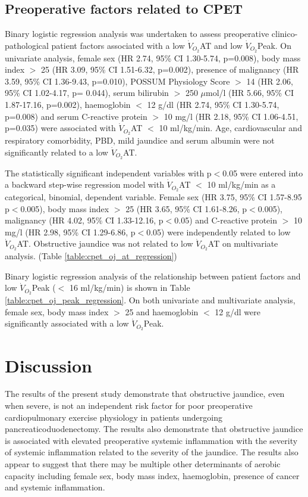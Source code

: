\subsection{Preoperative factors related to CPET}
Binary logistic regression analysis was undertaken to assess preoperative clinico-pathological patient factors associated with a low $\dot{V}_{O_2}$AT and low $\dot{V}_{O_2}$Peak. 
On univariate analysis, female sex (HR 2.74, 95\% CI 1.30-5.74, p=0.008), body mass index $>$ 25 (HR 3.09, 95\% CI 1.51-6.32, p=0.002), presence of malignancy (HR 3.59, 95\% CI 1.36-9.43, p=0.010), POSSUM Physiology Score $>$ 14 (HR 2.06, 95\% CI 1.02-4.17, p= 0.044), serum bilirubin $>$ 250 $\mu$mol/l (HR 5.66, 95\% CI 1.87-17.16, p=0.002), haemoglobin $<$ 12 g/dl (HR 2.74, 95\% CI 1.30-5.74, p=0.008) and serum C-reactive protein $>$ 10 mg/l (HR 2.18, 95\% CI 1.06-4.51, p=0.035) were associated with $\dot{V}_{O_2}$AT $<$ 10 ml/kg/min. 
Age, cardiovascular and respiratory comorbidity, PBD, mild jaundice and serum albumin were not significantly related to a low $\dot{V}_{O_2}$AT. 

The statistically significant independent variables with p$<$0.05 were entered into a backward step-wise regression model with $\dot{V}_{O_2}$AT $<$ 10 ml/kg/min as a categorical, binomial, dependent variable. 
Female sex (HR 3.75, 95\% CI 1.57-8.95 p$<$0.005), body mass index $>$ 25 (HR 3.65, 95\% CI 1.61-8.26, p$<$0.005), malignancy (HR 4.02, 95\% CI 1.33-12.16, p$<$0.05) and C-reactive protein $>$ 10 mg/l (HR 2.98, 95\% CI 1.29-6.86, p$<$0.05) were independently related to low $\dot{V}_{O_2}$AT. 
Obstructive jaundice was not related to low $\dot{V}_{O_2}$AT on multivariate analysis. (Table \ref{table:cpet_oj_at_regression})

Binary logistic regression analysis of the relationship between patient factors and low $\dot{V}_{O_2}$Peak ($<$ 16 ml/kg/min) is shown in Table \ref{table:cpet_oj_peak_regression}. 
On both univariate and multivariate analysis, female sex, body mass index $>$ 25 and haemoglobin $<$ 12 g/dl were significantly associated with a low $\dot{V}_{O_2}$Peak. 




\clearpage

\section{Discussion}

The results of the present study demonstrate that obstructive jaundice, even when severe, is not an independent risk factor for poor preoperative cardiopulmonary exercise physiology in patients undergoing pancreaticoduodenectomy. 
The results also demonstrate that obstructive jaundice is associated with elevated preoperative systemic inflammation with the severity of systemic inflammation related to the severity of the jaundice.
The results also appear to suggest that there may be multiple other determinants of aerobic capacity including female sex, body mass index, haemoglobin, presence of cancer and systemic inflammation.

